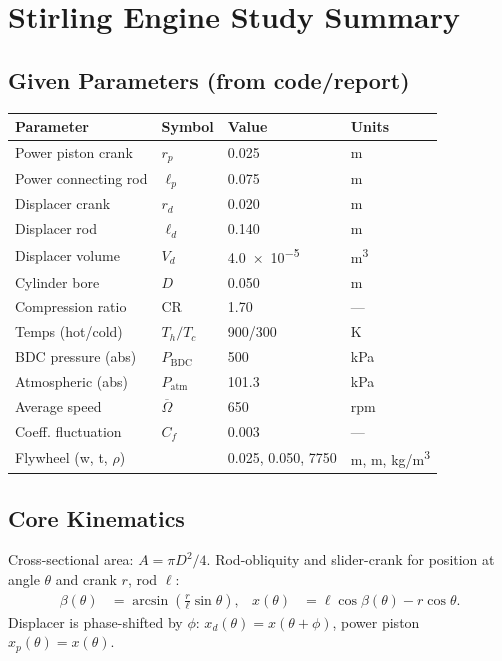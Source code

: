 \documentclass[11pt]{article}
\begin{document}
\section*{Stirling Engine Study Summary}
\subsection*{Given Parameters (from code/report)}
\begin{tabular}{@{}llll@{}}
\toprule
\textbf{Parameter} & \textbf{Symbol} & \textbf{Value} & \textbf{Units} \\
\midrule
Power piston crank & $r_p$ & \num{0.025} & \si{m} \\
Power connecting rod & $\ell_p$ & \num{0.075} & \si{m} \\
Displacer crank & $r_d$ & \num{0.020} & \si{m} \\
Displacer rod & $\ell_d$ & \num{0.140} & \si{m} \\
Displacer volume & $V_d$ & \num{4.0e-5} & \si{m^3} \\
Cylinder bore & $D$ & \num{0.050} & \si{m} \\
Compression ratio & CR & \num{1.70} & --- \\
Temps (hot/cold) & $T_h/T_c$ & \num{900}/\num{300} & \si{K} \\
BDC pressure (abs) & $P_{\text{BDC}}$ & \num{500} & \si{kPa} \\
Atmospheric (abs) & $P_{\text{atm}}$ & \num{101.3} & \si{kPa} \\
Average speed & $\overline{\Omega}$ & \num{650} & \si{rpm} \\
Coeff. fluctuation & $C_f$ & \num{0.003} & --- \\
Flywheel (w, t, $\rho$) & & \num{0.025}, \num{0.050}, \num{7750} & \si{m}, \si{m}, \si{kg/m^3} \\
\bottomrule
\end{tabular}

\subsection*{Core Kinematics}
Cross-sectional area: $A = \pi D^2/4$. Rod-obliquity and slider-crank for position at angle $\theta$ and crank $r$, rod $\ell$:
\begin{align}
\beta(\theta) &= \arcsin\!\left(\frac{r}{\ell}\sin\theta\right), & x(\theta) &= \ell\cos\beta(\theta) - r\cos\theta.
\end{align}
Displacer is phase-shifted by $\phi$: $x_d(\theta) = x(\theta+\phi)$, power piston $x_p(\theta)=x(\theta)$.
\end{document}
